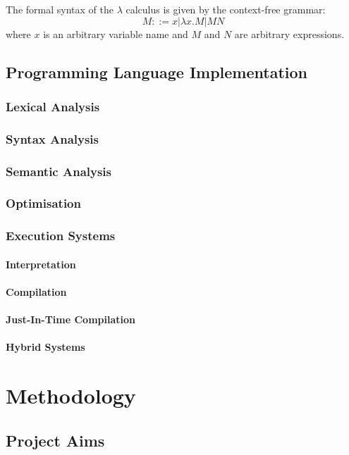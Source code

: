 \documentclass{article}
\begin{document}
The formal syntax of the $\lambda$ calculus is given by the context-free grammar:
\[ M ::= x | \lambda x.M | MN \]
where $x$ is an arbitrary variable name and $M$ and $N$ are arbitrary expressions.

\subsection{Programming Language Implementation}
\subsubsection{Lexical Analysis}
\subsubsection{Syntax Analysis}
\subsubsection{Semantic Analysis}
\subsubsection{Optimisation}
\subsubsection{Execution Systems}
\paragraph{Interpretation \\}
\paragraph{Compilation \\}
\paragraph{Just-In-Time Compilation \\}
\paragraph{Hybrid Systems \\}

\section{Methodology}
\subsection{Project Aims}
\end{document}
